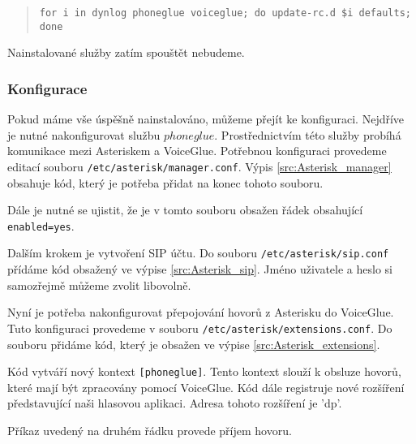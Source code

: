 \documentclass[ing,male,java,dept460]{diploma}						%
\begin{document}
\begin{quote}
\begin{sloppypar}
	\texttt{for i in dynlog phoneglue voiceglue; do update-rc.d \$i defaults; done}
\end{sloppypar}
\end{quote}

Nainstalované služby zatím spouštět nebudeme.

\subsubsection{Konfigurace}
Pokud máme vše úspěšně nainstalováno, můžeme přejít ke konfiguraci. Nejdříve je nutné nakonfigurovat službu $phoneglue$. Prostřednictvím této služby probíhá komunikace mezi Asteriskem a VoiceGlue. Potřebnou konfiguraci provedeme editací souboru \texttt{/etc/asterisk/manager.conf}. Výpis \ref{src:Asterisk_manager} obsahuje kód, který je potřeba přidat na konec tohoto souboru.



Dále je nutné se ujistit, že je v tomto souboru obsažen řádek obsahující \texttt{enabled=yes}.

Dalším krokem je vytvoření SIP účtu. Do souboru \texttt{/etc/asterisk/sip.conf} přídáme kód obsažený ve výpise \ref{src:Asterisk_sip}. Jméno uživatele a heslo si samozřejmě můžeme zvolit libovolně.



Nyní je potřeba nakonfigurovat přepojování hovorů z Asterisku do VoiceGlue. Tuto konfiguraci provedeme v souboru \texttt{/etc/asterisk/extensions.conf}. Do souboru přidáme kód, který je obsažen ve výpise \ref{src:Asterisk_extensions}.



Kód vytváří nový kontext \texttt{[phoneglue]}. Tento kontext slouží k obsluze hovorů, které mají být zpracovány pomocí VoiceGlue. Kód dále registruje nové rozšíření představující naši hlasovou aplikaci. Adresa tohoto rozšíření je 'dp'.

Příkaz uvedený na druhém řádku provede příjem hovoru.
\end{document}
